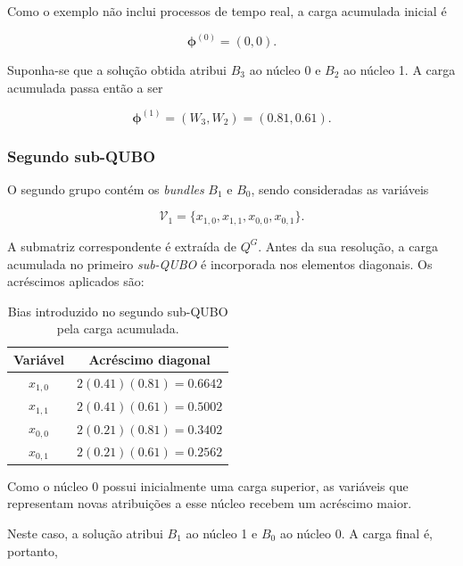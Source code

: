 Como o exemplo não inclui processos de tempo real, a carga acumulada
inicial é

\begin{equation}
    \boldsymbol{\phi}^{(0)}=(0,0).
\end{equation}

Suponha-se que a solução obtida atribui $B_3$
ao núcleo 0 e $B_2$ ao núcleo 1. A carga acumulada passa então a ser

\begin{equation}
    \boldsymbol{\phi}^{(1)}
    =
    (W_3,W_2)
    =
    (0.81,0.61).
\end{equation}

\subsubsection{Segundo sub-QUBO}

O segundo grupo contém os \textit{bundles} $B_1$ e $B_0$, sendo consideradas
as variáveis

\begin{equation}
    \mathcal{V}_1=
    \{x_{1,0},x_{1,1},x_{0,0},x_{0,1}\}.
\end{equation}

A submatriz correspondente é extraída de $Q^G$. Antes da sua resolução,
a carga acumulada no primeiro \textit{sub-QUBO} é incorporada nos
elementos diagonais. Os acréscimos aplicados são:

\begin{table}[H]
\centering
\begin{tabular}{|c|c|}
\hline
\textbf{Variável} & \textbf{Acréscimo diagonal} \\
\hline
$x_{1,0}$ & $2(0.41)(0.81)=0.6642$ \\
$x_{1,1}$ & $2(0.41)(0.61)=0.5002$ \\
$x_{0,0}$ & $2(0.21)(0.81)=0.3402$ \\
$x_{0,1}$ & $2(0.21)(0.61)=0.2562$ \\
\hline
\end{tabular}
\caption{Bias introduzido no segundo sub-QUBO pela carga acumulada.}
\label{tab:exemplo-bias-segundo-subqubo}
\end{table}

Como o núcleo 0 possui inicialmente uma carga superior, as variáveis que
representam novas atribuições a esse núcleo recebem um acréscimo maior.

Neste caso, a solução atribui $B_1$ ao núcleo 1 e $B_0$ ao núcleo 0. A
carga final é, portanto,

